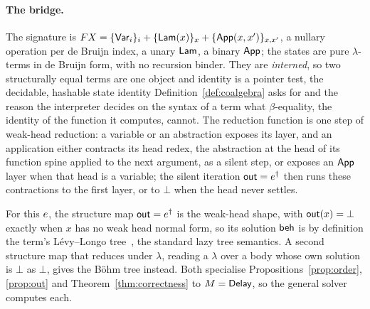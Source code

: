 \paragraph{The bridge.}
The signature is $F X = \{\mathsf{Var}_i\}_i + \{\mathsf{Lam}(x)\}_x + \{\mathsf{App}(x, x')\}_{x, x'}$, a nullary
operation per de Bruijn index, a unary $\mathsf{Lam}$, a binary $\mathsf{App}$; the states are pure
$\lambda$-terms in de Bruijn form, with no recursion binder. They are \emph{interned}, so two
structurally equal terms are one object and identity is a pointer test, the decidable, hashable
state identity Definition~\ref{def:coalgebra} asks for and the reason the interpreter decides on
the syntax of a term what $\beta$-equality, the identity of the function it computes, cannot. The
reduction function is one step of weak-head reduction: a variable or an abstraction exposes its
layer, and an application either contracts its head redex, the abstraction at the head of its
function spine applied to the next argument, as a silent step, or exposes an $\mathsf{App}$ layer when
that head is a variable; the silent iteration $\mathsf{out} = e^{\dagger}$ then runs these contractions
to the first layer, or to $\bot$ when the head never settles.

\begin{proposition}\label{prop:bridge}
  For this $e$, the structure map $\mathsf{out} = e^{\dagger}$ is the weak-head shape, with
  $\mathsf{out}(x) = \bot$ exactly when $x$ has no weak head normal form, so its solution $\mathsf{beh}$ is by
  definition the term's L\'evy--Longo tree~\cite{longo1983-set-theoretical-models}, the standard
  lazy tree semantics. A second structure map that reduces under $\lambda$, reading a $\lambda$
  over a body whose own solution is $\bot$ as $\bot$, gives the B\"ohm tree instead. Both
  specialise Propositions~\ref{prop:order}, \ref{prop:out} and Theorem~\ref{thm:correctness} to
  $M = \mathsf{Delay}$, so the general solver computes each.
\end{proposition}

